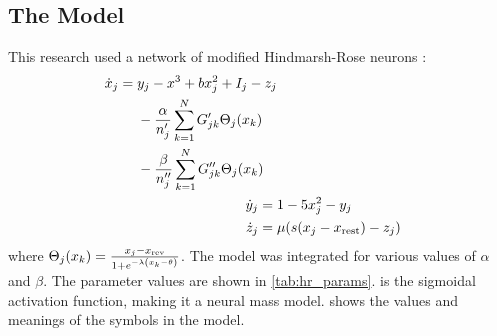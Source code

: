 \documentclass{beamer}
\newcommand{\hrx}{x}
\newcommand{\hry}{y}
\newcommand{\hrz}{z}
\newcommand{\hra}{\alpha}
\newcommand{\hrb}{\beta}
\begin{document}
\begin{frame}[t]
\begin{multicols}{3}
    \section{The Model}
    This research used a network of modified Hindmarsh-Rose neurons \cite{Santos2017}:
    \begin{align}
      \label{eq:hr_x}
      \begin{split}
      \dot{\hrx}_{j}
      ={}&
        \hry_{j}
        -
        \hrx^{3}
        +
        b \hrx_{j}^{2}
        +
        I_{j}
        -
        \hrz_{j} \\
        &-
        \frac{\hra}{n'_{j}} \sum_{k ={} 1}^{N} G'_{j k} \Theta_{j}(\hrx_{k}) \\
        &{}-
        \frac{\hrb}{n''_{j}} \sum_{k ={} 1}^{N} G''_{j k} \Theta_{j}(\hrx_{k})
      \end{split} \\
      \label{eq:hr_y}
      \dot{\hry}_{j}
      ={}&
        1
        -
        5 \hrx_{j}^{2}
        -
        \hry_{j} \\
      \label{eq:hr_z}
      \dot{\hrz}_{j}
      ={}&
        \mu \pqty{s \pqty{\hrx_{j} - \hrx_{\text{rest}}} - \hrz_{j}}
    \end{align}
    where $\Theta_{j}(\hrx_{k})
      =
      \frac{\hrx_{j} - \hrx_{\text{rev}}}{1 + e^{-\lambda \pqty{\hrx_{k} - \theta}}}$.
      The model was integrated for various values of $\hra$ and $\hrb$.
      The parameter values are shown in \cref{tab:hr_params}.
      is the sigmoidal activation function, making it a neural mass model.
       shows the values and meanings of the symbols in the model.


\end{multicols}
\end{frame}
\end{document}
